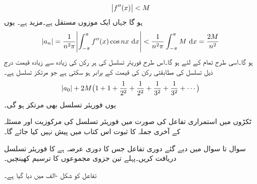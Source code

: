 \begin{align*}
\abs{f''(x)} <M
\end{align*}
ہو گا جہاں  ایک موزوں مستقل ہے۔مزید  ہے۔ یوں
\begin{align*}
\abs{a_n}=\frac{1}{n^2\pi}\abs{\int_{-\pi}^{\pi} f''(x) \cos nx \, \dif x}<\frac{1}{n^2\pi} \int_{-\pi}^{\pi} M \,\dif x=\frac{2M}{n^2}
\end{align*}
ہو گا۔اسی طرح تمام  کے لئے  ہو گا۔اس طرح فوریئر تسلسل کی ہر رکن کی زیادہ سے زیادہ قیمت درج ذیل تسلسل کی مطابقتی رکن کی قیمت کے برابر ہو سکتی ہے جو مرتکز تسلسل ہے۔
\begin{align*}
\abs{a_0}+2M\big(1+1+\frac{1}{2^2}+\frac{1}{2^2}+\frac{1}{3^2}+\frac{1}{3^2}+\cdots\big)
\end{align*}
یوں فوریئر تسلسل بھی مرتکز ہو گی۔

ٹکڑوں میں استمراری تفاعل  کی صورت میں فوریئر تسلسل کی مرکوزیت اور مسئلہ  کے آخری جملہ  کا ثبوت اس کتاب میں پیش نہیں کیا جائے گا۔ 

سوال  تا سوال  میں دیے گئے دوری تفاعل  جس کا دوری عرصہ  ہے  کا فوریئر تسلسل دریافت کریں۔پہلے تین جزوی مجموعوں کا ترسیم کھینچیں۔

\quad تفاعل کو شکل -الف میں دیا گیا ہے۔

